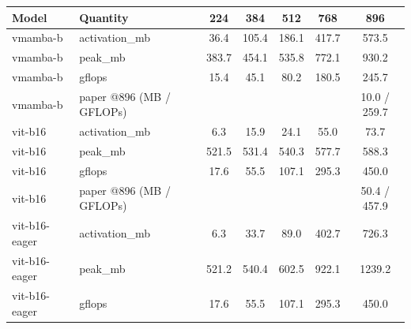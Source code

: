 \begin{tabular}{llccccc}
\toprule
Model & Quantity & 224 & 384 & 512 & 768 & 896 \\
\midrule
vmamba-b & activation\_mb & 36.4 & 105.4 & 186.1 & 417.7 & 573.5 \\
vmamba-b & peak\_mb & 383.7 & 454.1 & 535.8 & 772.1 & 930.2 \\
vmamba-b & gflops & 15.4 & 45.1 & 80.2 & 180.5 & 245.7 \\
vmamba-b & paper @896 (MB / GFLOPs) &  &  &  &  & 10.0 / 259.7 \\
vit-b16 & activation\_mb & 6.3 & 15.9 & 24.1 & 55.0 & 73.7 \\
vit-b16 & peak\_mb & 521.5 & 531.4 & 540.3 & 577.7 & 588.3 \\
vit-b16 & gflops & 17.6 & 55.5 & 107.1 & 295.3 & 450.0 \\
vit-b16 & paper @896 (MB / GFLOPs) &  &  &  &  & 50.4 / 457.9 \\
vit-b16-eager & activation\_mb & 6.3 & 33.7 & 89.0 & 402.7 & 726.3 \\
vit-b16-eager & peak\_mb & 521.2 & 540.4 & 602.5 & 922.1 & 1239.2 \\
vit-b16-eager & gflops & 17.6 & 55.5 & 107.1 & 295.3 & 450.0 \\
\bottomrule
\end{tabular}
